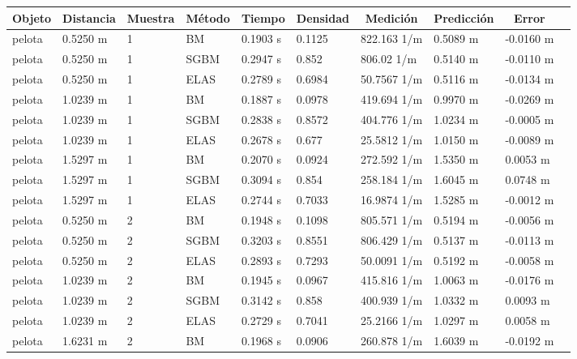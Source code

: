 \documentclass[11pt,a4paper,titlepage]{article}
\begin{document}
\begin{table}[!ht]
\small
\centering
\hspace*{-2cm}
\begin{tabular}{@{}llllllllll@{}}
\multicolumn{1}{c}{Objeto} & \multicolumn{1}{c}{Distancia} & \multicolumn{1}{c}{Muestra} & \multicolumn{1}{c}{Método} & \multicolumn{1}{c}{Tiempo} & \multicolumn{1}{c}{Densidad} & \multicolumn{1}{c}{Medición} & \multicolumn{1}{c}{Predicción} & \multicolumn{1}{c}{Error} \\ \midrule
pelota & 0.5250 m & 1 & BM & 0.1903 s & 0.1125 & 822.163 1/m & 0.5089 m & -0.0160 m \\ \midrule
pelota & 0.5250 m & 1 & SGBM & 0.2947 s & 0.852 & 806.02 1/m & 0.5140 m & -0.0110 m \\ \midrule
pelota & 0.5250 m & 1 & ELAS & 0.2789 s & 0.6984 & 50.7567 1/m & 0.5116 m & -0.0134 m \\ \midrule
pelota & 1.0239 m & 1 & BM & 0.1887 s & 0.0978 & 419.694 1/m & 0.9970 m & -0.0269 m \\ \midrule
pelota & 1.0239 m & 1 & SGBM & 0.2838 s & 0.8572 & 404.776 1/m & 1.0234 m & -0.0005 m \\ \midrule
pelota & 1.0239 m & 1 & ELAS & 0.2678 s & 0.677 & 25.5812 1/m & 1.0150 m & -0.0089 m \\ \midrule
pelota & 1.5297 m & 1 & BM & 0.2070 s & 0.0924 & 272.592 1/m & 1.5350 m & 0.0053 m \\ \midrule
pelota & 1.5297 m & 1 & SGBM & 0.3094 s & 0.854 & 258.184 1/m & 1.6045 m & 0.0748 m \\ \midrule
pelota & 1.5297 m & 1 & ELAS & 0.2744 s & 0.7033 & 16.9874 1/m & 1.5285 m & -0.0012 m \\ \midrule
pelota & 0.5250 m & 2 & BM & 0.1948 s & 0.1098 & 805.571 1/m & 0.5194 m & -0.0056 m \\ \midrule
pelota & 0.5250 m & 2 & SGBM & 0.3203 s & 0.8551 & 806.429 1/m & 0.5137 m & -0.0113 m \\ \midrule
pelota & 0.5250 m & 2 & ELAS & 0.2893 s & 0.7293 & 50.0091 1/m & 0.5192 m & -0.0058 m \\ \midrule
pelota & 1.0239 m & 2 & BM & 0.1945 s & 0.0967 & 415.816 1/m & 1.0063 m & -0.0176 m \\ \midrule
pelota & 1.0239 m & 2 & SGBM & 0.3142 s & 0.858 & 400.939 1/m & 1.0332 m & 0.0093 m \\ \midrule
pelota & 1.0239 m & 2 & ELAS & 0.2729 s & 0.7041 & 25.2166 1/m & 1.0297 m & 0.0058 m \\ \midrule
pelota & 1.6231 m & 2 & BM & 0.1968 s & 0.0906 & 260.878 1/m & 1.6039 m & -0.0192 m \\ \midrule

\end{tabular}
\end{table}
\end{document}
